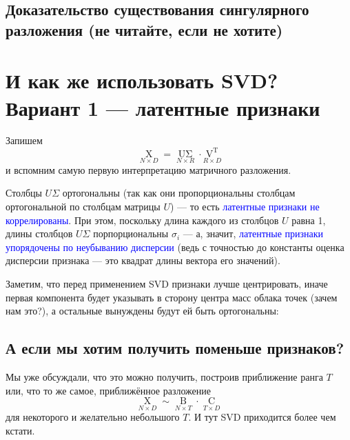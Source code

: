 \documentclass{amsart}
\theoremstyle{definition}
\theoremstyle{remark}
\numberwithin{equation}{section}
\begin{document}
\begin{center}
\end{center}

\subsection{Доказательство существования сингулярного разложения (не читайте, если не хотите)} 

\section{И как же использовать SVD? Вариант 1 --- латентные признаки}

Запишем
$$\underset{N\times D}{\operatorname{X}} = \underset{N\times R}{\operatorname{U\Sigma}} \cdot \underset{R\times D}{\operatorname{V^T}}$$
и вспомним самую первую интерпретацию матричного разложения.

\begin{center}
\end{center}

Столбцы $U\Sigma$ ортогональны (так как они пропорциональны столбцам ортогональной по столбцам матрицы $U$) --- то есть \textcolor{blue}{латентные признаки не коррелированы}. При этом, поскольку длина каждого из столбцов $U$ равна 1, длины столбцов $U\Sigma$ порпорциональны $\sigma_i$ --- а, значит, \textcolor{blue}{латентные признаки упорядочены по неубыванию дисперсии} (ведь с точностью до константы оценка дисперсии признака --- это квадрат длины вектора его значений).

Заметим, что перед применением SVD признаки лучше центрировать, иначе первая компонента будет указывать в сторону центра масс облака точек (зачем нам это?), а остальные вынуждены будут ей быть ортогональны:

\begin{center}
\end{center}

\subsection{А если мы хотим получить поменьше признаков?} Мы уже обсуждали, что это можно получить, построив приближение ранга $T$ или, что то же самое, приближённое разложение
$$\underset{N\times D}{\operatorname{X}} \sim \underset{N\times T}{\operatorname{B}} \cdot \underset{T\times D}{\operatorname{C}}$$
для некоторого и желательно небольшого $T$. И тут SVD приходится более чем кстати. 
\end{document}
